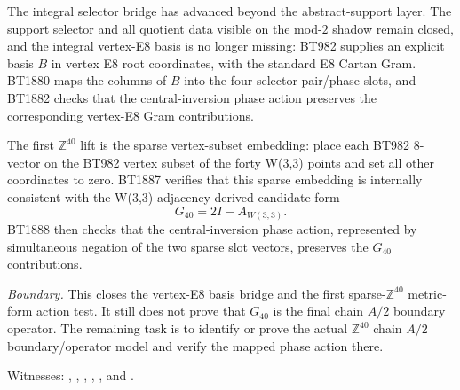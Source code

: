 %

\begin{result}
The integral selector bridge has advanced beyond the abstract-support layer.  The support selector and
all quotient data visible on the mod-$2$ shadow remain closed, and the integral vertex-E8 basis is no
longer missing: BT982 supplies an explicit basis $B$ in vertex E8 root coordinates, with the standard E8
Cartan Gram.  BT1880 maps the columns of $B$ into the four selector-pair/phase slots, and BT1882 checks
that the central-inversion phase action preserves the corresponding vertex-E8 Gram contributions.

The first $\mathbb Z^{40}$ lift is the sparse vertex-subset embedding: place each BT982 $8$-vector on the
BT982 vertex subset of the forty W(3,3) points and set all other coordinates to zero.  BT1887 verifies
that this sparse embedding is internally consistent with the W(3,3) adjacency-derived candidate form
\[
  G_{40}=2I-A_{W(3,3)}.
\]
BT1888 then checks that the central-inversion phase action, represented by simultaneous negation of the
two sparse slot vectors, preserves the $G_{40}$ contributions.

\emph{Boundary.}  This closes the vertex-E8 basis bridge and the first sparse-$\mathbb Z^{40}$ metric-form
action test.  It still does not prove that $G_{40}$ is the final chain $A/2$ boundary operator.  The
remaining task is to identify or prove the actual $\mathbb Z^{40}$ chain $A/2$ boundary/operator model and
verify the mapped phase action there.

Witnesses: ,
,
,
,
, and
.
\end{result}
